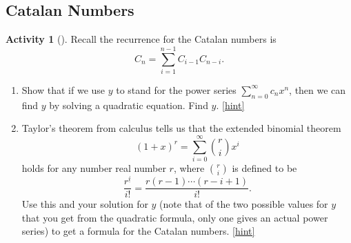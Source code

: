 \documentclass[10pt,]{book}
\theoremstyle{plain}
\theoremstyle{definition}
\theoremstyle{definition}
\theoremstyle{definition}
\newtheorem{activity}[project]{Activity}
\numberwithin{equation}{chapter}
\begin{document}
\subsection[{Catalan Numbers}]{Catalan Numbers}\label{subsection-39}
\begin{activity}[]\label{CatalanRecurrence}
\hypertarget{p-1384}{}%
Recall the recurrence for the Catalan numbers is%
\begin{equation*}
C_n = \sum_{i=1}^{n-1} C_{i-1}C_{n-i}\text{.}
\end{equation*}
%
\begin{enumerate}[font=\bfseries,label=(\alph*),ref=\alph*]
\item\label{task-252} \hypertarget{p-1385}{}%
Show that if we use \(y\) to stand for the power series \(\sum_{n=0}^\infty c_nx^n\), then we can find \(y\) by solving a quadratic equation. Find \(y\).%
\hfill{\tiny\hyperlink{a-271.a}{[hint]}\hypertarget{q-271.a}{}}\item\label{task-253} \hypertarget{p-1388}{}%
Taylor's theorem from calculus tells us that the extended binomial theorem%
\begin{equation*}
(1+x)^r = \sum_{i=0}^\infty \binom{r}{i}x^i
\end{equation*}
holds for any number real number \(r\), where \(\binom{r}{i}\) is defined to be%
\begin{equation*}
\frac{r^{\underline{i}}}{i!} = \frac{r(r-1)\cdots(r-i+1)}{i!}\text{.}
\end{equation*}
Use this and your solution for \(y\) (note that of the two possible values for \(y\) that you get from the quadratic formula, only one gives an actual power series) to get a formula for the Catalan numbers.%
\hfill{\tiny\hyperlink{a-271.b}{[hint]}\hypertarget{q-271.b}{}}\end{enumerate}
\end{activity}
\typeout{************************************************}
\typeout{************************************************}
\end{document}
